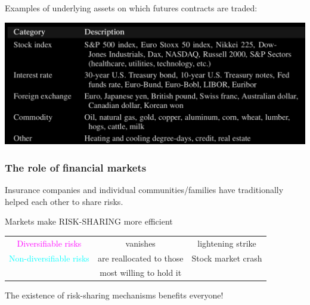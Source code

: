 \begin{frame}[fragile,t]
\begin{center}
	Examples of underlying assets on which futures contracts are traded: \bigskip

	\includegraphics[scale=0.25]{figs/Table1-2.png}
\end{center}
\end{frame}
\begin{frame}[fragile,t]
	\frametitle{The role of financial markets}
	\begin{center}
	Insurance companies and individual communities/families have traditionally helped each other to share risks.
	\pause
	\bigskip
	\mySeparateLine
	\bigskip

	Markets make \textcolor{alert}{RISK-SHARING} more efficient \\
	\bigskip
	\renewcommand{\arraystretch}{1.2}
	\begin{tabular}{c|c|c}
		\textcolor{magenta}{Diversifiable risks}  & vanishes                 & lightening strike  \\
		\textcolor{cyan}{Non-diversifiable risks} & are reallocated to those & Stock market crash \\
                                              & most willing to hold it  &                    \\
	\end{tabular}
	\bigskip
	\bigskip
	\pause

	The existence of risk-sharing mechanisms benefits everyone!
	\end{center}
\end{frame}
